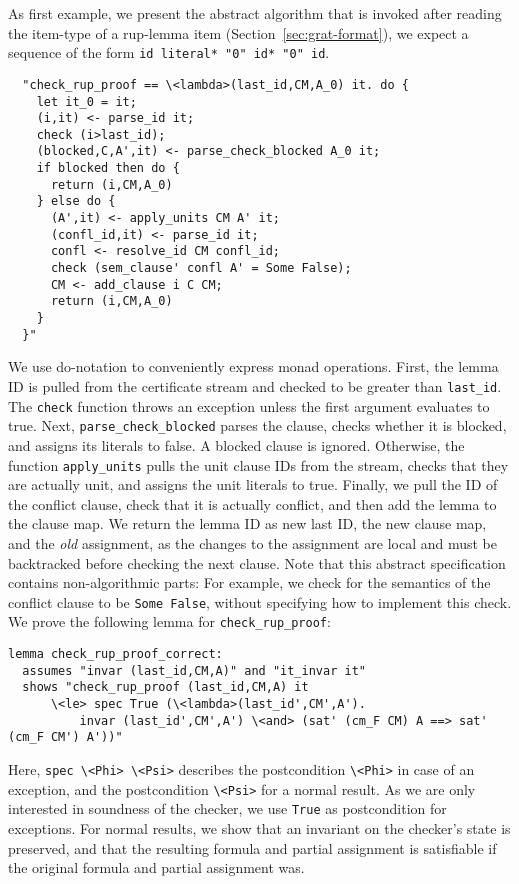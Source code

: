 \documentclass{llncs}
\newcommand{\isai}{\lstinline[language=isabelle,basicstyle=\normalsize\ttfamily\slshape]}
\begin{document}
As first example, we present the abstract algorithm that is invoked after reading the item-type of a rup-lemma item (\cf Section~\ref{sec:grat-format}),
\ie we expect a sequence of the form \lstinline[language={},literate={}]{id literal* "0" id* "0" id}.
\begin{lstlisting}
  "check_rup_proof == \<lambda>(last_id,CM,A_0) it. do {
    let it_0 = it;
    (i,it) <- parse_id it;
    check (i>last_id);
    (blocked,C,A',it) <- parse_check_blocked A_0 it;
    if blocked then do {
      return (i,CM,A_0)
    } else do {
      (A',it) <- apply_units CM A' it;
      (confl_id,it) <- parse_id it;
      confl <- resolve_id CM confl_id;
      check (sem_clause' confl A' = Some False);
      CM <- add_clause i C CM;
      return (i,CM,A_0)
    }
  }"
\end{lstlisting}
We use do-notation to conveniently express monad operations. 
First, the lemma ID is pulled from the certificate stream and checked to be greater than \isai{last_id}.
The \isai$check$ function throws an exception unless the first argument evaluates to true.
Next, \isai{parse_check_blocked} parses the clause, checks whether it is blocked, and assigns its literals to false. A blocked clause is ignored. Otherwise, the function
\isai$apply_units$ pulls the unit clause IDs from the stream, checks that they are actually unit, and assigns the unit literals to true.
Finally, we pull the ID of the conflict clause, check that it is actually conflict, and then add the lemma to the clause map. 
We return the lemma ID as new last ID, the new clause map, and the \emph{old} assignment, as the changes to the assignment are local and must be backtracked before checking
the next clause.
Note that this abstract specification contains non-algorithmic parts: For example, we check for the semantics of the conflict clause to be \isai{Some False}, without
specifying how to implement this check.
%
We prove the following lemma for \isai{check_rup_proof}:
\begin{lstlisting}
lemma check_rup_proof_correct: 
  assumes "invar (last_id,CM,A)" and "it_invar it"
  shows "check_rup_proof (last_id,CM,A) it 
      \<le> spec True (\<lambda>(last_id',CM',A'). 
          invar (last_id',CM',A') \<and> (sat' (cm_F CM) A ==> sat' (cm_F CM') A'))"  
\end{lstlisting}
Here, \isai{spec \<Phi> \<Psi>} describes the postcondition \isai$\<Phi>$ in case of an exception, and the postcondition \isai$\<Psi>$ for a normal result.
As we are only interested in soundness of the checker, we use \isai$True$ as postcondition for exceptions. For normal results, 
we show that an invariant on the checker's state is preserved, and that the resulting formula and partial assignment is satisfiable if the original formula and partial assignment was.
\end{document}
